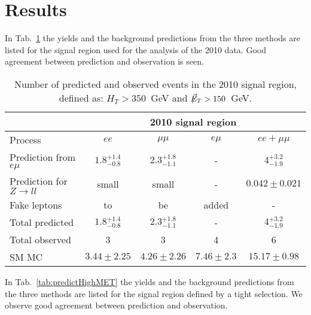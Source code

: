 \section{Results}\label{sec:results}

In Tab.~\ref{tab:predict2010} the yields and the background predictions
from the three methods are listed for the signal region used for the analysis
of the 2010 data. Good agreement between prediction and
observation is seen.

\begin{table}[hbt]
\begin{center}
\caption{\label{tab:predict2010}Number of predicted and observed events in the 2010 signal region, 
    defined as: $H_T > 350$~GeV and $\not\!\!\vec{E}_{T} > 150$~GeV.}
\begin{tabular}{l|ccc|c}
\hline
                       & \multicolumn{4}{c}{2010 signal region}               \\
\hline 
Process                & $ee$          & $\mu\mu$ &  $e\mu$   & $ee+\mu\mu$   \\
\hline
Prediction from $e\mu$ & $1.8 {}_{-0.8}^{+1.4}$ &  $2.3 {}_{-1.1}^{+1.8}$ & - & $4 {}_{-1.9}^{+3.2}$   \\
Prediction for $Z \rightarrow ll$ & small & small & - & $0.042 \pm 0.021$   \\
Fake leptons           &  to  & be & added & - \\                  
\hline
Total predicted        & $1.8 {}_{-0.8}^{+1.4}$ &  $2.3 {}_{-1.1}^{+1.8}$ & - & $4 {}_{-1.9}^{+3.2}$  \\
\hline\hline
Total observed         & 3          & 3 & 4 & 6         \\
\hline \hline
SM MC         &$3.44 \pm 2.25$&$4.26 \pm 2.26$&$7.46 \pm 2.3$ & $15.17 \pm 0.98$  \\
\hline
\end{tabular}
\end{center}
\end{table}


In Tab.~\ref{tab:predictHighMET} the yields and the background predictions
from the three methods are listed for the signal region defined by a tight
\MET selection. We observe good agreement between prediction
and observation.

